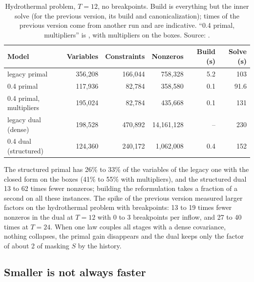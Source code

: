 \begin{table}[ht]
\centering
\caption[Hydrothermal problem]{Hydrothermal problem, $T = 12$, no breakpoints.
Build is everything but the inner solve (for the previous version, its build and canonicalization);
times of the previous version come from another run and are indicative.
``0.4 primal, multipliers'' is , with multipliers on the boxes.
Source: .}
\label{tab:hydro-legacy}
\begin{tabular}{lrrrrr}
\toprule
Model & Variables & Constraints & Nonzeros & Build (s) & Solve (s) \\
\midrule
legacy primal & 356,208 & 166,044 & 758,328 & 5.2 & 103 \\
0.4 primal & 117,936 & 82,784 & 358,580 & 0.1 & 91.6 \\
0.4 primal, multipliers & 195,024 & 82,784 & 435,668 & 0.1 & 131 \\
legacy dual (dense) & 198,528 & 470,892 & 14,161,128 & -- & 230 \\
0.4 dual (structured) & 124,360 & 240,172 & 1,062,008 & 0.4 & 152 \\
\bottomrule
\end{tabular}
\end{table}

The structured primal has 26\% to 33\% of the variables of the legacy one with the closed form on the boxes (41\% to 55\% with multipliers), and the structured dual 13 to 62 times fewer nonzeros;
building the reformulation takes a fraction of a second on all these instances.
The spike of the previous version measured larger factors on the hydrothermal problem with breakpoints:
13 to 19 times fewer nonzeros in the dual at $T = 12$ with 0 to 3 breakpoints per inflow, and 27 to 40 times at $T = 24$.
When one law couples all stages with a dense covariance, nothing collapses, the primal gain disappears and the dual keeps only the factor of about 2 of masking $S$ by the history.

\subsection{Smaller is not always faster}
\label{sec:faster}

